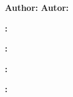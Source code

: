 \large
\vspace{5cm}
\begin{center}

  \LARGE\textbf{\myDegreefull}

  \vspace{25mm}

  \LARGE\textbf{\myWorkTypeFull}

  \LARGE{\myBookTitle}

  \vspace{5cm}

  {
    \textbf{Author:}  \myAuthorFullName
  }
  {
    \textbf{Autor:}  \myAuthorFullName
  }

  \vspace{0.5cm}

  {
    \textbf{\expandafter\makefirstuc\expandafter{\wordAdvisor}:} \myAcademicTutorFullName{}

    \ifCoTutorPresent
    {
      \textbf{\expandafter\makefirstuc\expandafter{\wordCoAdvisor}:} \myCoTutorFullName{}
    }
    {
    }
  }
  {%
    \textbf{\expandafter\makefirstuc\expandafter{\wordTutorOrTutora}:} \myAcademicTutorFullName{}

    \ifCoTutorPresent
    {
      \textbf{\expandafter\makefirstuc\expandafter{\wordCoTutorOrCoTutora}:} \myCoTutorFullName{}
    }
    {
    }
  }

\end{center}

\begin{bottomparagraph}
  \begin{center}
    \huge{\myThesisDefenseYear}
  \end{center}
\end{bottomparagraph}

\clearemptydoublepage

